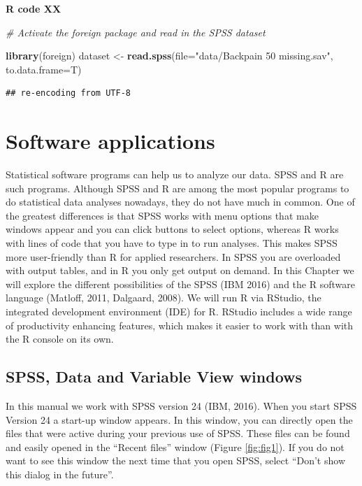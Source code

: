 \documentclass[]{book}
\newenvironment{Shaded}{\begin{snugshade}}{\end{snugshade}}
\newcommand{\KeywordTok}[1]{\textcolor[rgb]{0.13,0.29,0.53}{\textbf{#1}}}
\newcommand{\DataTypeTok}[1]{\textcolor[rgb]{0.13,0.29,0.53}{#1}}
\newcommand{\StringTok}[1]{\textcolor[rgb]{0.31,0.60,0.02}{#1}}
\newcommand{\CommentTok}[1]{\textcolor[rgb]{0.56,0.35,0.01}{\textit{#1}}}
\newcommand{\NormalTok}[1]{#1}
\theoremstyle{definition}
\theoremstyle{definition}
\theoremstyle{definition}
\theoremstyle{remark}
\begin{document}
\textbf{R code XX}

\begin{Shaded}
\begin{Highlighting}[]
\CommentTok{# Activate the foreign package and read in the SPSS dataset}

\KeywordTok{library}\NormalTok{(foreign)}
\NormalTok{dataset <-}\StringTok{ }\KeywordTok{read.spss}\NormalTok{(}\DataTypeTok{file=}\StringTok{"data/Backpain 50 missing.sav"}\NormalTok{, }\DataTypeTok{to.data.frame=}\NormalTok{T)}
\end{Highlighting}
\end{Shaded}

\begin{verbatim}
## re-encoding from UTF-8
\end{verbatim}

\chapter{Software applications}\label{software-applications}

Statistical software programs can help us to analyze our data. SPSS and
R are such programs. Although SPSS and R are among the most popular
programs to do statistical data analyses nowadays, they do not have much
in common. One of the greatest differences is that SPSS works with menu
options that make windows appear and you can click buttons to select
options, whereas R works with lines of code that you have to type in to
run analyses. This makes SPSS more user-friendly than R for applied
researchers. In SPSS you are overloaded with output tables, and in R you
only get output on demand. In this Chapter we will explore the different
possibilities of the SPSS (IBM 2016) and the R software language
(Matloff, 2011, Dalgaard, 2008). We will run R via RStudio, the
integrated development environment (IDE) for R. RStudio includes a wide
range of productivity enhancing features, which makes it easier to work
with than with the R console on its own.

\section{SPSS, Data and Variable View
windows}\label{spss-data-and-variable-view-windows}

In this manual we work with SPSS version 24 (IBM, 2016). When you start
SPSS Version 24 a start-up window appears. In this window, you can
directly open the files that were active during your previous use of
SPSS. These files can be found and easily opened in the ``Recent files''
window (Figure \ref{fig:fig1}). If you do not want to see this window
the next time that you open SPSS, select ``Don't show this dialog in the
future''.
\end{document}
